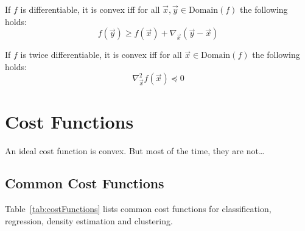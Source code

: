 		If \(f\) is differentiable, it is convex iff for all \( \vec{x}, \vec{y} \in \textrm{Domain}(f) \) the following holds:
		\begin{equation}
			f(\vec{y}) \geq f(\vec{x}) + \nabla_{\vec{x}}(\vec{y} - \vec{x})
		\end{equation}

		If \(f\) is twice differentiable, it is convex iff for all \( \vec{x} \in \textrm{Domain}(f) \) the following holds:
		\begin{equation}
			\nabla_{\vec{x}}^2 f(\vec{x}) \preceq 0
		\end{equation}


	\section{Cost Functions}
		An ideal cost function is convex. But most of the time, they are not\dots

		\subsection{Common Cost Functions}
			Table~\ref{tab:costFunctions} lists common cost functions for classification, regression, density estimation and clustering.

